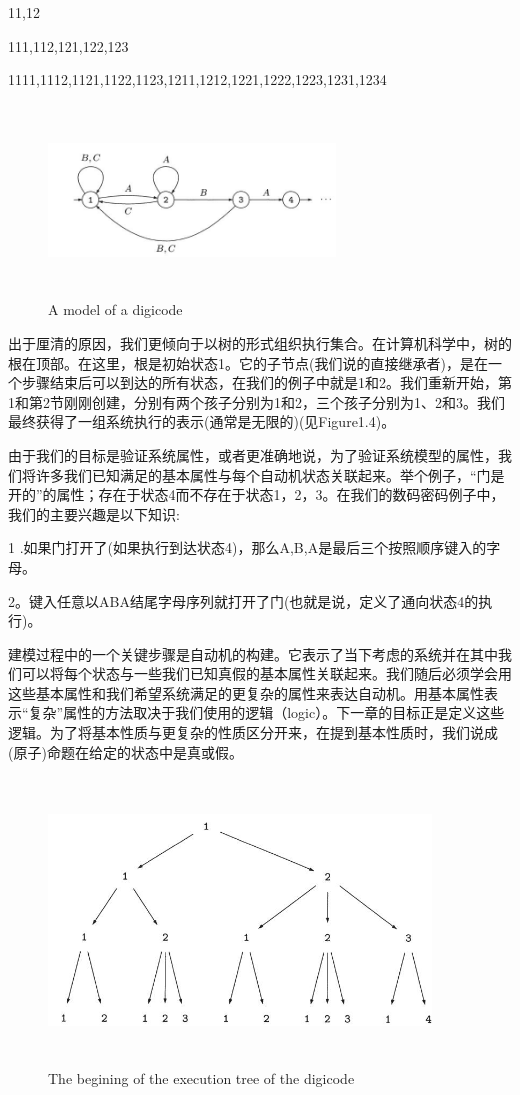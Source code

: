 \documentclass{book}
\begin{document}
    11,12

    111,112,121,122,123

    1111,1112,1121,1122,1123,1211,1212,1221,1222,1223,1231,1234
    \begin{figure}
    \centering
    \includegraphics[height=2.0in,width=3.0in]{1_3.jpg}
    \caption{A model of a digicode}
    \end{figure}

    出于厘清的原因，我们更倾向于以树的形式组织执行集合。在计算机科学中，树的根在顶部。在这里，根是初始状态1。它的子节点(我们说的直接继承者)，是在一个步骤结束后可以到达的所有状态，在我们的例子中就是1和2。我们重新开始，第1和第2节刚刚创建，分别有两个孩子分别为1和2，三个孩子分别为1、2和3。我们最终获得了一组系统执行的表示(通常是无限的)(见Figure1.4)。

    由于我们的目标是验证系统属性，或者更准确地说，为了验证系统模型的属性，我们将许多我们已知满足的基本属性与每个自动机状态关联起来。举个例子，“门是开的”的属性；存在于状态4而不存在于状态1，2，3。在我们的数码密码例子中，我们的主要兴趣是以下知识:

    1 .如果门打开了(如果执行到达状态4)，那么A,B,A是最后三个按照顺序键入的字母。

    2。键入任意以ABA结尾字母序列就打开了门(也就是说，定义了通向状态4的执行)。

    建模过程中的一个关键步骤是自动机的构建。它表示了当下考虑的系统并在其中我们可以将每个状态与一些我们已知真假的基本属性关联起来。我们随后必须学会用这些基本属性和我们希望系统满足的更复杂的属性来表达自动机。用基本属性表示“复杂”属性的方法取决于我们使用的逻辑（logic）。下一章的目标正是定义这些逻辑。为了将基本性质与更复杂的性质区分开来，在提到基本性质时，我们说成(原子)命题在给定的状态中是真或假。
    \begin{figure}
    \centering
    \includegraphics[height=3.0in,width=4.0in]{1_4.jpg}
    \caption{The begining of the execution tree of the digicode}
    \end{figure}
\end{document}
